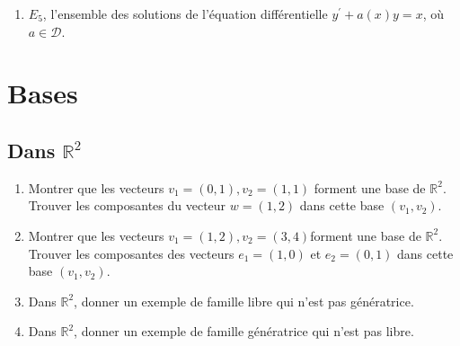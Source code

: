 \begin{enumerate}
      \vspace{1em}

      \item $E_5$, l'ensemble des solutions de l'équation différentielle $y^{\prime}+a(x) y=x$, où $a \in \mathcal{D}$.

      \vspace{1em}

    \end{enumerate}

\section*{Bases}
\vspace{2em}

\subsection{Dans $\mathbb{R}^2$}
\begin{enumerate}
\item  Montrer que les vecteurs $v_1=(0,1), v_2=(1,1)$ forment une base de $\mathbb{R}^2$. \newline 
Trouver les composantes du vecteur $w=(1,2)$ dans cette base $\left(v_1, v_2\right)$.

\item Montrer que les vecteurs $v_1=(1,2), v_2=(3,4)$forment une base de $\mathbb{R}^2$. \newline 
Trouver les composantes des vecteurs $e_1=(1,0)$ et $e_2=(0,1)$ dans cette base $\left(v_1, v_2\right)$.

\item Dans $\mathbb{R}^2$, donner un exemple de famille libre qui n'est pas génératrice.

\item Dans $\mathbb{R}^2$, donner un exemple de famille génératrice qui n'est pas libre.

\end{enumerate}

